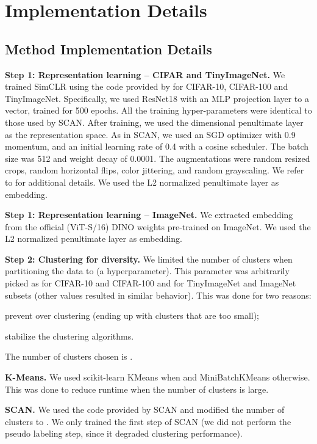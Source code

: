 \documentclass{article}
\newcommand{\myparagraph}[1]{\smallskip\noindent\textbf{#1}}
\begin{document}
\section{Implementation Details}
\subsection{Method Implementation Details}
\label{app:method_implementation_details}
\myparagraph{Step 1: Representation learning -- CIFAR and TinyImageNet.}
We trained SimCLR using the code provided by \citet{van2020scan} for CIFAR-10, CIFAR-100 and TinyImageNet. Specifically, we used ResNet18 with an MLP projection layer to a  vector, trained for 500 epochs. All the training hyper-parameters were identical to those used by SCAN.
After training, we used the  dimensional penultimate layer as the representation space.
As in SCAN, we used an SGD optimizer with 0.9 momentum, and an initial learning rate of 0.4 with a cosine scheduler. The batch size was 512 and weight decay of 0.0001.
The augmentations were random resized crops, random horizontal flips, color jittering, and random grayscaling. We refer to \citet{van2020scan} for additional details. We used the L2 normalized penultimate layer as embedding.


\myparagraph{Step 1: Representation learning -- ImageNet.}
We extracted embedding from the official (ViT-S/16) DINO weights pre-trained on ImageNet. We used the L2 normalized penultimate layer as embedding.


\myparagraph{Step 2: Clustering for diversity.}
We limited the number of clusters when partitioning the data to   (a hyperparameter). This parameter was arbitrarily picked as  for CIFAR-10 and CIFAR-100 and  for TinyImageNet and ImageNet subsets (other values resulted in similar behavior).
This was done for two reasons: \begin{inparaenum}[(a)]
    \item prevent over clustering (ending up with clusters that are too small);
    \item stabilize the clustering algorithms.
\end{inparaenum}
The number of clusters chosen is .

\myparagraph{K-Means.} 
We used scikit-learn KMeans when  and MiniBatchKMeans otherwise. This was done to reduce runtime when the number of clusters is large.

\myparagraph{SCAN.} 
We used the code provided by SCAN and modified the number of clusters to . We only trained the first step of SCAN (we did not perform the pseudo labeling step, since it degraded clustering performance).
\end{document}
